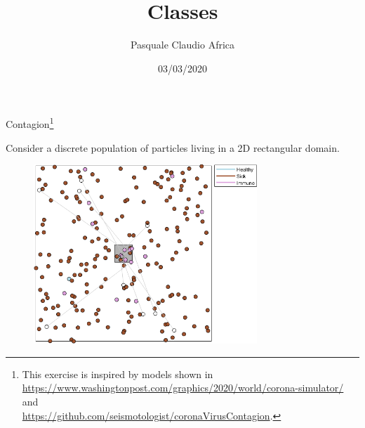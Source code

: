 \documentclass[10pt]{beamer}
\begin{document}
    \title{Classes}
    \author{Pasquale Claudio Africa}
    \date{03/03/2020}
    
\begin{frame}
    \maketitle
\end{frame}

\begin{frame}{Contagion\footnote{This exercise is inspired by models shown in \\
\url{https://www.washingtonpost.com/graphics/2020/world/corona-simulator/} and \\
\url{https://github.com/seismotologist/coronaVirusContagion}.}}

Consider a discrete population of particles living in a 2D rectangular domain.

\begin{figure}
    \includegraphics[width=0.75\textwidth]{contagion.png}
\end{figure}
\end{frame}
\end{document}
